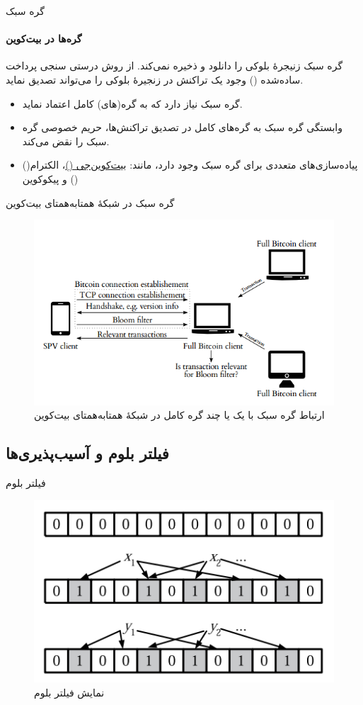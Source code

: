 \documentclass{beamer}
\begin{document}
\begin{frame}{گره سبک}
	\framesubtitle{گره‌ها در بیت‌کوین}
	\begin{definition}
		گره سبک زنیجرهٔ بلوکی را دانلود و ذخیره نمی‌کند. از روش درستی سنجی پرداخت ساده‌شده () وجود یک تراکنش در زنجیرهٔ بلوکی را می‌تواند تصدیق نماید.
	\end{definition}
	\begin{itemize}
		\item {%
		گره سبک نیاز دارد که به گره(های) کامل اعتماد نماید.}
		\item {%
		وابستگی گره سبک به گره‌های کامل در تصدیق تراکنش‌ها، حریم خصوصی گره سبک را نقض می‌کند. }
		\item{%
	پیاده‌سازی‌های متعددی برای گره سبک وجود دارد، مانند:
	\underline{بیت‌کوین‌جی ()}، الکترام() و پیکوکوین ()
	}
	\end{itemize}
\end{frame}

\begin{frame}{گره سبک در شبکهٔ همتا‌به‌همتای بیت‌کوین}
	
\begin{figure}
	\centering
	\includegraphics[width=0.7\linewidth]{./images/SPV}
	\caption{%
		ارتباط گره سبک با یک یا چند گره کامل در شبکهٔ همتا‌به‌همتای بیت‌کوین 
	}
	\label{fig:spv}
\end{figure}

	
\end{frame}

\subsection{فیلتر بلوم و آسیب‌پذیری‌ها}
\begin{frame}{فیلتر بلوم}
	\begin{figure}
		\centering
		\includegraphics[width=0.7\linewidth]{images/BloomFilter}
		\caption{نمایش فیلتر بلوم
		}
		\label{fig:bloomfilter}
	\end{figure}
\end{frame}
\end{document}
